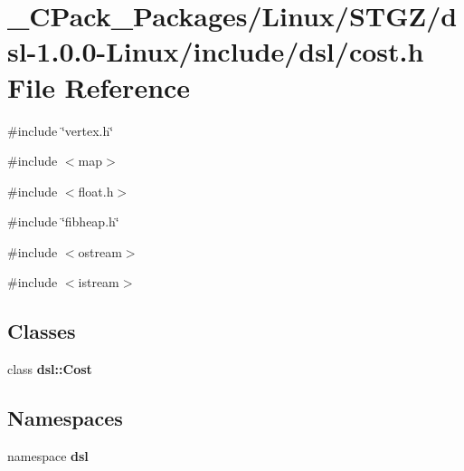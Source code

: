 \section{\_\-CPack\_\-Packages/Linux/STGZ/dsl-\/1.0.0-\/Linux/include/dsl/cost.h File Reference}
\label{__CPack__Packages_2Linux_2STGZ_2dsl-1_80_80-Linux_2include_2dsl_2cost_8h}
{\ttfamily \#include \char`\"{}vertex.h\char`\"{}}\par
{\ttfamily \#include $<$map$>$}\par
{\ttfamily \#include $<$float.h$>$}\par
{\ttfamily \#include \char`\"{}fibheap.h\char`\"{}}\par
{\ttfamily \#include $<$ostream$>$}\par
{\ttfamily \#include $<$istream$>$}\par
\subsection*{Classes}
\begin{DoxyCompactItemize}
\item 
class {\bf dsl::Cost}
\end{DoxyCompactItemize}
\subsection*{Namespaces}
\begin{DoxyCompactItemize}
\item 
namespace {\bf dsl}
\end{DoxyCompactItemize}
